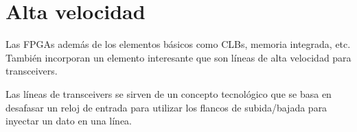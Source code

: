 \chapter{Alta velocidad}

Las FPGAs además de los elementos básicos como
CLBs, memoria integrada, etc.
También incorporan un elemento interesante que son 
líneas de alta velocidad para transceivers.

Las líneas de transceivers se sirven de un concepto tecnológico que se 
basa en desafasar un reloj de entrada para utilizar los flancos
de subida/bajada para inyectar un dato en una línea.
